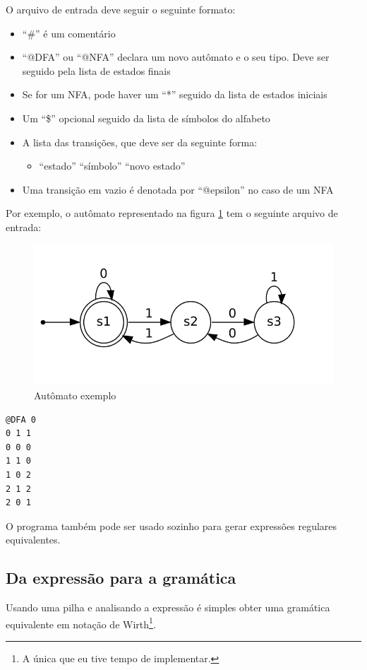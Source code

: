 \documentclass[a4 paper, 12pt]{article}
\begin{document}
O arquivo de entrada deve seguir o seguinte formato:
\begin{itemize}
\item ``\#'' \'e um coment\'ario
\item ``@DFA'' ou ``@NFA'' declara um novo aut\^omato e o seu
  tipo. Deve ser seguido pela lista de estados finais
\item Se for um NFA, pode haver um ``*'' seguido da lista de estados
  iniciais
\item Um ``\$'' opcional seguido da lista de s\'imbolos do alfabeto
\item A lista das transi\c c\~oes, que deve ser da seguinte forma:
  \begin{itemize}
  \item ``estado'' ``s\'imbolo'' ``novo estado''
  \end{itemize}
\item Uma transi\c c\~ao em vazio \'e denotada por ``@epsilon'' no
  caso de um NFA
\end{itemize}

Por exemplo, o aut\^omato representado na figura \ref{fig:2} tem o seguinte
arquivo de entrada:
\begin{figure}[H]
  \centering
  \includegraphics[width=0.5\pdfpagewidth]{output2.png}
  \caption{Aut\^omato exemplo}
  \label{fig:2}
\end{figure}

\begin{verbatim}
@DFA 0
0 1 1
0 0 0
1 1 0
1 0 2
2 1 2
2 0 1

\end{verbatim}

O programa tamb\'em pode ser usado sozinho para gerar express\~oes
regulares equivalentes.

\subsection{Da express\~ao para a gram\'atica}
Usando uma pilha e analisando a express\~ao \'e simples obter uma
gram\'atica equivalente em nota\c c\~ao de Wirth\footnote{A \'unica
  que eu tive tempo de implementar.}.
\end{document}

